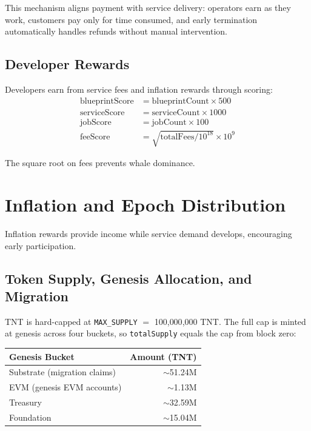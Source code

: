 \documentclass[11pt,a4paper]{article}
\begin{document}
This mechanism aligns payment with service delivery: operators earn as they work, customers pay only for time consumed, and early termination automatically handles refunds without manual intervention.

\subsection{Developer Rewards}

Developers earn from service fees and inflation rewards through scoring:
\begin{align*}
\text{blueprintScore} &= \text{blueprintCount} \times 500 \\
\text{serviceScore} &= \text{serviceCount} \times 1000 \\
\text{jobScore} &= \text{jobCount} \times 100 \\
\text{feeScore} &= \sqrt{\text{totalFees} / 10^{18}} \times 10^9
\end{align*}

The square root on fees prevents whale dominance.

\section{Inflation and Epoch Distribution}
\label{sec:inflation}

Inflation rewards provide income while service demand develops, encouraging early participation.

\subsection{Token Supply, Genesis Allocation, and Migration}

TNT is hard-capped at \texttt{MAX\_SUPPLY} $=$ 100{,}000{,}000 TNT.
The full cap is minted at genesis across four buckets, so \texttt{totalSupply} equals the cap from block zero:

\begin{center}
\begin{tabular}{lr}
\toprule
Genesis Bucket & Amount (TNT) \\
\midrule
Substrate (migration claims) & $\sim$51.24M \\
EVM (genesis EVM accounts) & $\sim$1.13M \\
Treasury & $\sim$32.59M \\
Foundation & $\sim$15.04M \\
\bottomrule
\end{tabular}
\end{center}
\end{document}
